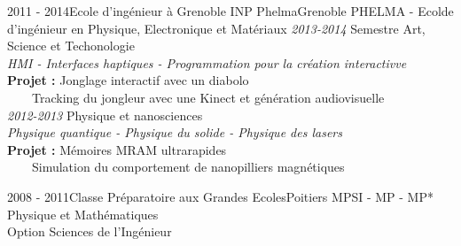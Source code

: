\documentclass[a4paper]{genard-cv}
\begin{document}
\begin{body}
	\education
		\begin{entry}
			{2011 - 2014}{Ecole d'ingénieur à Grenoble INP Phelma}{Grenoble}
			{PHELMA - Ecolde d'ingénieur en Physique, Electronique et Matériaux}
			\textit{2013-2014} Semestre Art, Science et Techonologie\\
			\textit{HMI - Interfaces haptiques - Programmation pour la création interactivve}\\
			\textbf{Projet :} Jonglage interactif avec un diabolo\\
      ~~~~Tracking du jongleur avec une Kinect et génération audiovisuelle
			\medskip\\

			\textit{2012-2013} Physique et nanosciences\\
			\textit{Physique quantique - Physique du solide - Physique des lasers}\\
			\textbf{Projet :} Mémoires MRAM ultrarapides\\
			~~~~Simulation du comportement de nanopilliers magnétiques
			\medskip\\

		\end{entry}
		\begin{entry}
			{2008 - 2011}{Classe Préparatoire aux Grandes Ecoles}{Poitiers}
			{MPSI - MP - MP*}
			Physique et Mathématiques\\
			Option Sciences de l'Ingénieur
		\end{entry}

\end{body}
\end{document}
